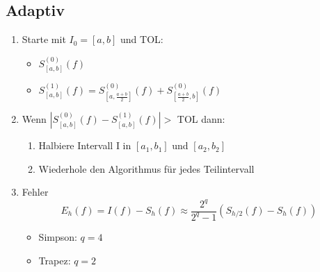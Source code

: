 \subsection{Adaptiv}
\begin{enumerate}
	
	\item Starte mit $I_0 = [a, b]$ und TOL: \\
	\begin{itemize}
		\item $S_{[a,b]}^{(0)}(f)$
		\item $S_{[a,b]}^{(1)}(f) = S_{[a,\frac{a+b}{2}]}^{(0)}(f) + S_{[\frac{a+b}{2},b]}^{(0)}(f)$
	\end{itemize}
	
	\item Wenn $|S_{[a,b]}^{(0)}(f) - S_{[a,b]}^{(1)}(f)| >$ TOL dann: \\
	
	\begin{enumerate}
		
		\item Halbiere Intervall I in $[a_1, b_1]$ und $[a_2, b_2]$	
		
		\item Wiederhole den Algorithmus für jedes Teilintervall
		
	\end{enumerate}
	
	\item Fehler
	\begin{equation*}
		E_h(f)= I(f) - S_h(f) \approx \frac{2^q}{2^q-1}(S_{h/2}(f)-S_h(f))
	\end{equation*}
	\begin{itemize}
		\item Simpson: $q = 4$
		\item Trapez: $q = 2$
	\end{itemize}
	
\end{enumerate}